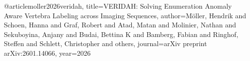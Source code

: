 @article{moller2026veridah,
  title={VERIDAH: Solving Enumeration Anomaly Aware Vertebra Labeling across Imaging Sequences},
  author={M{\"o}ller, Hendrik and Schoen, Hanna and Graf, Robert and Atad, Matan and Molinier, Nathan and Sekuboyina, Anjany and Budai, Bettina K and Bamberg, Fabian and Ringhof, Steffen and Schlett, Christopher and others},
  journal={arXiv preprint arXiv:2601.14066},
  year={2026}
}
